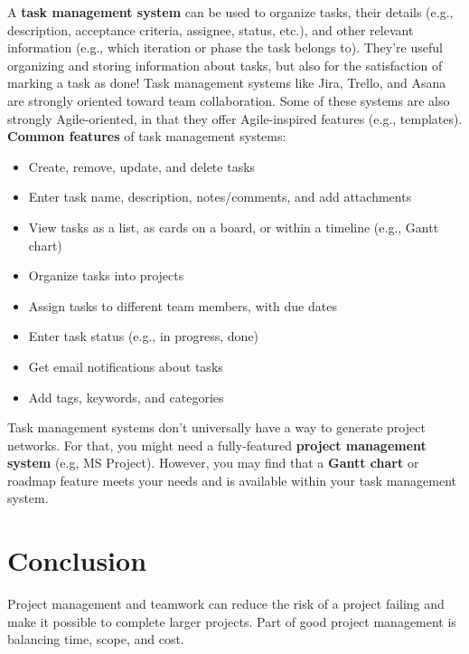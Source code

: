 A \textbf{task management system}\marginpar{\taskManagementSystemDef} can be used to organize tasks, their details (e.g., description, acceptance criteria, assignee, status, etc.), and other relevant information (e.g., which iteration or phase the task belongs to). They're useful organizing and storing information about tasks, but also for the satisfaction of marking a task as done! Task management systems like Jira, Trello, and Asana are strongly oriented toward team collaboration. Some of these systems are also strongly Agile-oriented, in that they offer Agile-inspired features (e.g., templates). \textbf{Common features} of task management systems:

\begin{itemize}
    \item Create, remove, update, and delete tasks\marginpar{\projectManagementSystemDef\margindivider}\marginpar{\ganttChartDef}
    \item Enter task name, description, notes/comments, and add attachments
    \item View tasks as a list, as cards on a board, or within a timeline (e.g., Gantt chart)
    \item Organize tasks into projects
    \item Assign tasks to different team members, with due dates
    \item Enter task status (e.g., in progress, done)
    \item Get email notifications about tasks
    \item Add tags, keywords, and categories
\end{itemize}

Task management systems don't universally have a way to generate project networks. For that, you might need a fully-featured \textbf{project management system} (e.g, MS Project). However, you may find that a \textbf{Gantt chart} or roadmap feature meets your needs and is available within your task management system.

\section{Conclusion}
Project management and teamwork can reduce the risk of a project failing and make it possible to complete larger projects. Part of good project management is balancing time, scope, and cost.

